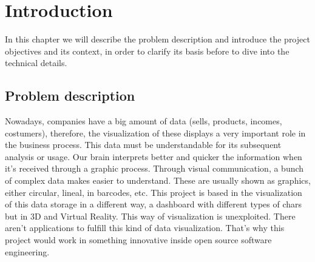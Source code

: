 \documentclass[a4paper, 12pt]{book}
\begin{document}


\tableofcontents 
\cleardoublepage
\listoffigures %


\cleardoublepage
\chapter{Introduction}
\label{sec:intro} %

In this chapter we will describe the problem description and introduce the project objectives and its context, in order to clarify its basis before to dive into the technical details.

\section{Problem description}
\label{sec:probdescr}

Nowadays, companies have a big amount of data (sells, products, incomes, costumers), therefore, the visualization of these displays a very important role in the business process. This data must be understandable for its subsequent analysis or usage. Our brain interprets better and quicker the information when it's received through a graphic process. Through visual communication, a bunch of complex data makes easier to understand. These are usually shown as graphics, either circular, lineal, in barcodes, etc. This project is based in the visualization of this data storage in a different way, a dashboard with different types of chars but in 3D and Virtual Reality. This way of visualization is unexploited. There aren't applications to fulfill this kind of data visualization. That's why this project would work in something innovative inside open source software engineering.
\end{document}
